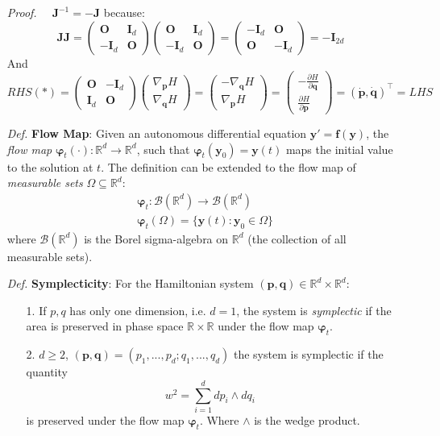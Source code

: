 \documentclass[a4paper, 11pt]{article}
\begin{document}
\begin{itemize}
	\textit{Proof.~~} $\bm{J}^{-1} = -\bm{J}$ because:
	$$\bm{JJ} = \begin{pmatrix}
		\bm{O} & \bm{I}_d \\
		-\bm{I}_d & \bm{O}
	\end{pmatrix}\begin{pmatrix}
		\bm{O} & \bm{I}_d \\
		-\bm{I}_d & \bm{O}
	\end{pmatrix} = \begin{pmatrix}
		-\bm{I}_d & \bm{O} \\
		\bm{O} & -\bm{I}_d
	\end{pmatrix} = -\bm{I}_{2d}$$
	And 
	$$
	RHS(*) = \begin{pmatrix}
		\bm{O} & -\bm{I}_d \\
		\bm{I}_d & \bm{O}
	\end{pmatrix} \begin{pmatrix}
		\nabla_{\bm{p}}H \\
		\nabla_{\bm{q}}H
	\end{pmatrix} = \begin{pmatrix}
		-\nabla_{\bm{q}}H\\
		\nabla_{\bm{p}}H
	\end{pmatrix} = \begin{pmatrix}
		-\frac{\partial H}{\partial \bm{q}}\\
		\frac{\partial H}{\partial \bm{p}}
	\end{pmatrix} = (\dot{\bm{p}}, \dot{\bm{q}})^{\top} = LHS
	$$
	\item[\textit{Def.}] \textbf{Flow Map}: Given an autonomous differential equation $\bm{y}'=\bm{f}(\bm{y})$, the \emph{flow map} $\bm{\varphi}_t(\cdot): \mathbb{R}^d \to \mathbb{R}^d$, such that $\bm{\varphi}_t(\bm{y}_0) = \bm{y}(t)$ maps the initial value to the solution at $t$. The definition can be extended to the flow map of \emph{measurable sets} $\Omega \subseteq \mathbb{R}^d$: 
	\begin{equation}
		\begin{split}
			&\bm{\varphi}_t: \mathcal{B}(\mathbb{R}^d) \to \mathcal{B}(\mathbb{R}^d) \\
			&\bm{\varphi}_t(\Omega) = \{\bm{y}(t): \bm{y}_0 \in \Omega\}
		\end{split}
	\end{equation}
	where $\mathcal{B}(\mathbb{R}^d)$ is the Borel sigma-algebra on $\mathbb{R}^d$ (the collection of all measurable sets).
	\item[\textit{Def.}] \textbf{Symplecticity}: For the Hamiltonian system $(\bm{p}, \bm{q}) \in \mathbb{R}^d \times \mathbb{R}^d$:
	\begin{itemize}
		\item[1.] If $p,q$ has only one dimension, i.e. $d=1$, the system is \emph{symplectic} if the area is preserved in phase space $\mathbb{R} \times \mathbb{R}$ under the flow map $\bm{\varphi}_t$.
		\item[2.] $d\geq 2$, $(\bm{p}, \bm{q}) = (p_1, ..., p_d; q_1, ..., q_d)$ the system is symplectic if the quantity
		$$
		w^2 = \sum_{i=1}^d dp_i \wedge dq_i
		$$
		is preserved under the flow map $\bm{\varphi}_t$. Where $\wedge$ is the wedge product.
	\end{itemize}


\end{itemize}
\end{document}
